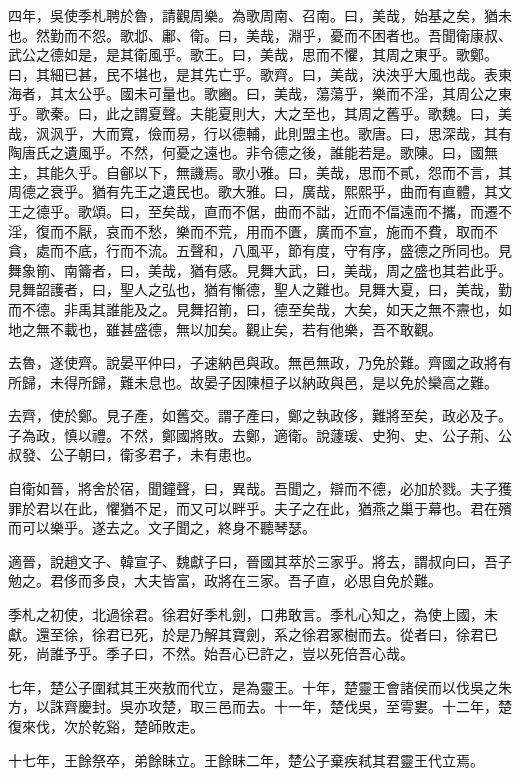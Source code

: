四年，吳使季札聘於魯，請觀周樂。為歌周南、召南。曰，美哉，始基之矣，猶未也。然勤而不怨。歌邶、鄘、衛。曰，美哉，淵乎，憂而不困者也。吾聞衛康叔、武公之德如是，是其衛風乎。歌王。曰，美哉，思而不懼，其周之東乎。歌鄭。曰，其細已甚，民不堪也，是其先亡乎。歌齊。曰，美哉，泱泱乎大風也哉。表東海者，其太公乎。國未可量也。歌豳。曰，美哉，蕩蕩乎，樂而不淫，其周公之東乎。歌秦。曰，此之謂夏聲。夫能夏則大，大之至也，其周之舊乎。歌魏。曰，美哉，沨沨乎，大而寬，儉而易，行以德輔，此則盟主也。歌唐。曰，思深哉，其有陶唐氏之遺風乎。不然，何憂之遠也。非令德之後，誰能若是。歌陳。曰，國無主，其能久乎。自鄶以下，無譏焉。歌小雅。曰，美哉，思而不貳，怨而不言，其周德之衰乎。猶有先王之遺民也。歌大雅。曰，廣哉，熙熙乎，曲而有直體，其文王之德乎。歌頌。曰，至矣哉，直而不倨，曲而不詘，近而不偪遠而不攜，而遷不淫，復而不厭，哀而不愁，樂而不荒，用而不匱，廣而不宣，施而不費，取而不貪，處而不底，行而不流。五聲和，八風平，節有度，守有序，盛德之所同也。見舞象箾、南籥者，曰，美哉，猶有感。見舞大武，曰，美哉，周之盛也其若此乎。見舞韶護者，曰，聖人之弘也，猶有慚德，聖人之難也。見舞大夏，曰，美哉，勤而不德。非禹其誰能及之。見舞招箾，曰，德至矣哉，大矣，如天之無不燾也，如地之無不載也，雖甚盛德，無以加矣。觀止矣，若有他樂，吾不敢觀。

去魯，遂使齊。說晏平仲曰，子速納邑與政。無邑無政，乃免於難。齊國之政將有所歸，未得所歸，難未息也。故晏子因陳桓子以納政與邑，是以免於欒高之難。

去齊，使於鄭。見子產，如舊交。謂子產曰，鄭之執政侈，難將至矣，政必及子。子為政，慎以禮。不然，鄭國將敗。去鄭，適衛。說蘧瑗、史狗、史、公子荊、公叔發、公子朝曰，衛多君子，未有患也。

自衛如晉，將舍於宿，聞鐘聲，曰，異哉。吾聞之，辯而不德，必加於戮。夫子獲罪於君以在此，懼猶不足，而又可以畔乎。夫子之在此，猶燕之巢于幕也。君在殯而可以樂乎。遂去之。文子聞之，終身不聽琴瑟。

適晉，說趙文子、韓宣子、魏獻子曰，晉國其萃於三家乎。將去，謂叔向曰，吾子勉之。君侈而多良，大夫皆富，政將在三家。吾子直，必思自免於難。

季札之初使，北過徐君。徐君好季札劍，口弗敢言。季札心知之，為使上國，未獻。還至徐，徐君已死，於是乃解其寶劍，系之徐君冢樹而去。從者曰，徐君已死，尚誰予乎。季子曰，不然。始吾心已許之，豈以死倍吾心哉。

七年，楚公子圍弒其王夾敖而代立，是為靈王。十年，楚靈王會諸侯而以伐吳之朱方，以誅齊慶封。吳亦攻楚，取三邑而去。十一年，楚伐吳，至雩婁。十二年，楚復來伐，次於乾谿，楚師敗走。

十七年，王餘祭卒，弟餘眛立。王餘眛二年，楚公子棄疾弒其君靈王代立焉。

